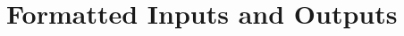 \chapter{Formatted Inputs and Outputs} \label{ch:FormatIO}


\graphicspath{{Chapters/FormatIO/Figures/}}


